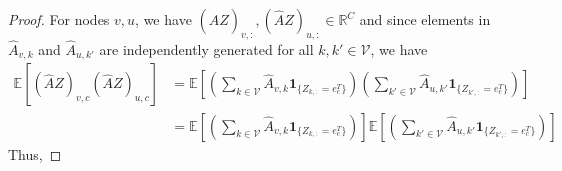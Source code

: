 \documentclass{article}
\newcommand{\e}{\boldsymbol{e}}
\newcommand{\0}{{\boldsymbol{0}}}
\newcommand{\6}{{\partial}}
\newcommand{\8}{{\infty}}
\newcommand{\4}{{\nabla}}
\begin{document}
\begin{proof}
\iffalse
\begin{equation}
\label{eq:elements_of_similarity_matrix}
\begin{aligned}
    & \mathbb{E}\left[(\hat{A}Z)_{v,c}\right] =  \mathbb{E}\left[\sum\limits_{k \in \mathcal{V}} \hat{A}_{v,k} \bm{1}_{\{Z_{k,:}= \e_c^T\}}\right] = \sum\limits_{k \in \mathcal{V}} \mathbb{E}\left[ \frac{1}{d_v+1} \bm{1}_{\{Z_{k,:}= \e_c^T\}}\right] =   \\
    &  \left\{
             \begin{array}{ll}
              \mathbb{E}\left[ \frac{hd_v+1}{d_v+1} \right] = \mathbb{E}\left[ \frac{h(d_v+1)+1-h}{d_v+1} \right] =  \mathbb{E}\left[h+ \frac{1-h}{d_v+1} \right] = \frac{hd+1}{d+1}, & v \text{ is in class } c \\
              \mathbb{E}\left[ \frac{(1-h)d_v}{(C-1)(d_v+1)} \right] = \mathbb{E}\left[ \frac{1-h}{C-1}- \frac{(1-h)}{(C-1)(d_v+1)} \right] = \frac{(1-h)d}{(C-1)(d+1)}, & v \text{ is not in class } c
             \end{array}\right.
\end{aligned}
\end{equation}
where $\bm{1}$ is the indicator function. 
\fi
For nodes $v,u$, we have $(\hat{A}Z)_{v,:}, (\hat{A}Z)_{u,:} \in \mathbb{R}^C$ and since elements in $\hat{A}_{v,k}$ and $\hat{A}_{u,k'}$ are independently generated for all $k,k' \in \mathcal{V}$, we have
\begin{align*}
    \mathbb{E}\left[(\hat{A}Z)_{v,c} (\hat{A}Z)_{u,c}\right] & =  \mathbb{E}\left[(\sum\limits_{k \in \mathcal{V}} \hat{A}_{v,k} \textbf{1}_{\{Z_{k,:}= e_c^T\}}) (\sum\limits_{k' \in \mathcal{V}} \hat{A}_{u,k'} \textbf{1}_{\{Z_{k',:}= e_c^T\}}) \right] \\
    & = \mathbb{E}\left[(\sum\limits_{k \in \mathcal{V}} \hat{A}_{v,k} \textbf{1}_{\{Z_{k,:}= e_c^T\}}) \right] \mathbb{E} \left[ (\sum\limits_{k' \in \mathcal{V}} \hat{A}_{u,k'} \textbf{1}_{\{Z_{k',:}= e_c^T\}}) \right]
\end{align*}
Thus,


\end{proof}
\end{document}
